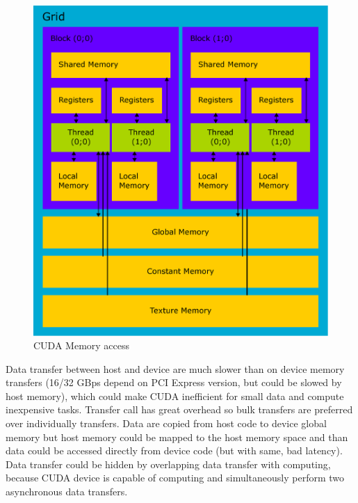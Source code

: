 \begin{figure}[h]
  \centering
  \includegraphics[width=0.6\linewidth]{img/CUDAmemAccess.eps}
  \caption{CUDA Memory access}
  \label{fig:cudamemaccess}
\end{figure}%

Data transfer between host and device are much slower than on device memory transfers (16/32 GBps depend on PCI Express version, but could be slowed by host memory), which could make CUDA inefficient for small data and compute inexpensive tasks. Transfer call has great overhead so bulk transfers are preferred over individually transfers. Data are copied from host code to device global memory but host memory could be mapped to the host memory space and than data could be accessed directly from device code (but with same, bad latency). Data transfer could be hidden by overlapping data transfer with computing, because CUDA device is capable of computing and simultaneously perform two asynchronous data transfers.

